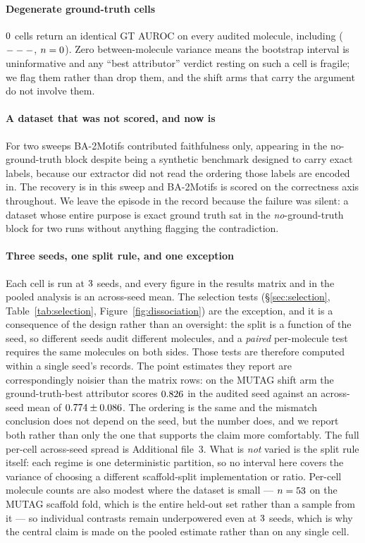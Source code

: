 \ifHasDegenerateCells
\paragraph{Degenerate ground-truth cells} $0{}$ cells return
an identical GT AUROC on every audited molecule, including \degenCell{}
($---{}$, $n=0{}$). Zero between-molecule variance means the
bootstrap interval is uninformative and any ``best attributor'' verdict resting
on such a cell is fragile; we flag them rather than drop them, and the shift
arms that carry the argument do not involve them.
\fi

\paragraph{A dataset that was not scored, and now is} For two sweeps
BA-2Motifs contributed faithfulness only, appearing in the no-ground-truth
block despite being a synthetic benchmark designed to carry exact labels,
because our extractor did not read the ordering those labels are encoded in.
The recovery is in this sweep and BA-2Motifs is scored on the correctness axis
throughout. We leave the episode in the record because the failure was silent:
a dataset whose entire purpose is exact ground truth sat in the
\emph{no}-ground-truth block for two runs without anything flagging the
contradiction.

\paragraph{Three seeds, one split rule, and one exception} Each cell is run at
$3{}$ seeds, and every figure in the results matrix and in the
pooled analysis is an across-seed mean. The selection tests
(\S\ref{sec:selection}, Table~\ref{tab:selection}, Figure~\ref{fig:dissociation})
are the exception, and it is a consequence of the design rather than an
oversight: the split is a function of the seed, so different seeds audit
different molecules, and a \emph{paired} per-molecule test requires the same
molecules on both sides. Those tests are therefore computed within a single
seed's records. The point estimates they report are correspondingly noisier
than the matrix rows: on the MUTAG shift arm the ground-truth-best attributor
scores $0.826{}$ in the audited seed against an across-seed mean
of $0.774{}\pm0.086{}$. The ordering is the
same and the mismatch conclusion does not depend on the seed, but the number
does, and we report both rather than only the one that supports the claim more
comfortably. The full per-cell across-seed spread is Additional file~3. What is \emph{not} varied is the
split rule itself: each regime is one deterministic partition, so no interval
here covers the variance of choosing a different scaffold-split implementation
or ratio. Per-cell molecule counts are also modest where the dataset is
small --- $n=53{}$ on the MUTAG scaffold fold, which is the entire
held-out set rather than a sample from it --- so individual contrasts remain
underpowered even at $3{}$ seeds, which is why the central claim
is made on the pooled estimate rather than on any single cell.

